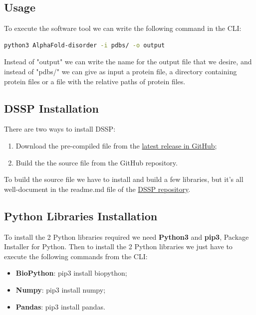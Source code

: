 \subsection{Usage}
To execute the software tool we can write the following command in the CLI:


\begin{lstlisting}[language=Bash]
    python3 AlphaFold-disorder -i pdbs/ -o output
\end{lstlisting}

\vspace{1em}

Instead of "output" we can write the name for the output file that we desire, and instead of "pdbs/" we can give as input a protein file, a directory containing protein files or a file with the relative paths of protein files.
\vspace{2em}
\subsection{DSSP Installation}
There are two ways to install DSSP: 
\begin{enumerate}
    \item Download the pre-compiled file from the  \href{https://github.com/PDB-REDO/dssp/releases/tag/v4.4.0}{latest release in GitHub};
    \item Build the the source file from the GitHub repository.
\end{enumerate}
To build the source file we have to install and build a few libraries, but it's all well-document in the readme.md file of the \href{https://github.com/PDB-REDO/dssp}{DSSP repository}. 

\subsection{Python Libraries Installation}
To install the 2 Python libraries required we need \textbf{Python3} and \textbf{pip3}, Package Installer for Python. Then to install the 2 Python libraries we just have to execute the following commands from the CLI:
\begin{itemize}
    \item \textbf{BioPython}: pip3 install biopython;
    \item \textbf{Numpy}: pip3 install numpy;
    \item \textbf{Pandas}: pip3 install pandas.
\end{itemize}